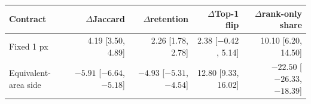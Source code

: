 \begin{tabular}{@{}lrrrr@{}}
\toprule
Contract & $\Delta$Jaccard & $\Delta$retention & $\Delta$Top-1 flip & $\Delta$rank-only share \\
\midrule
Fixed 1 px & 4.19 [3.50, 4.89] & 2.26 [1.78, 2.78] & 2.38 [$-0.42$, 5.14] & 10.10 [6.20, 14.50] \\
Equivalent-area side & $-5.91$ [$-6.64$, $-5.18$] & $-4.93$ [$-5.31$, $-4.54$] & 12.80 [9.33, 16.02] & $-22.50$ [$-26.33$, $-18.39$] \\
\bottomrule
\end{tabular}
